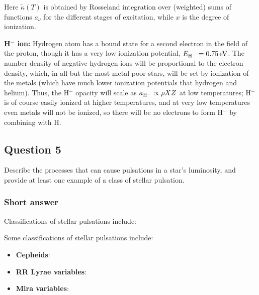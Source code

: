 \documentclass[a4paper,10pt]{article}
\begin{document}
{\noindent}Here $\tilde{\kappa}(T)$ is obtained by Rosseland integration over (weighted) sums of functions $a_\nu$ for the different stages of excitation, while $x$ is the degree of ionization.

{\noindent}\textbf{H$^-$ ion:} Hydrogen atom has a bound state for a second electron in the field of the proton, though it has a very low ionization potential, $E_{{\rm H}^-}=0.75\,{\rm eV}$. The number density of negative hydrogen ions will be proportional to the electron density, which, in all but the most metal-poor stars, will be set by ionization of the metals (which have much lower ionization potentials that hydrogen and helium). Thus, the H$^-$ opacity will scale as $\kappa_{{\rm H}^-} \propto \rho XZ$ at low temperatures; H$^-$ is of course easily ionized at higher temperatures, and at very low temperatures even metals will not be ionized, so there will be no electrons to form H$^-$ by combining with H.


\newpage
\subsection{Question 5}

Describe the processes that can cause pulsations in a star's luminosity, and provide at least one example of a class of stellar pulsation.

\subsubsection{Short answer}

Classifications of stellar pulsations include:

Some classifications of stellar pulsations include:

\begin{itemize}
    \item \textbf{Cepheids}: 
    \item \textbf{RR Lyrae variables}: 
    \item \textbf{Mira variables}: 
\end{itemize}
\end{document}
